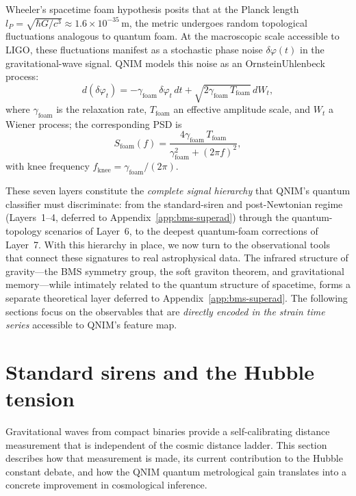\documentclass[11pt,a4paper, english]{book}
\theoremstyle{plain}
\theoremstyle{definition}
\numberwithin{equation}{chapter}
\numberwithin{figure}{chapter}
\numberwithin{table}{chapter}
\begin{document}
Wheeler's spacetime foam hypothesis posits that at the Planck length
$l_P = \sqrt{\hbar G/c^3} \approx 1.6\times10^{-35}$\,m, the metric
undergoes random topological fluctuations analogous to quantum foam.
At the macroscopic scale accessible to LIGO, these fluctuations manifest
as a stochastic phase noise $\delta\varphi(t)$ in the gravitational-wave
signal.  QNIM models this noise as an OrnsteinUhlenbeck process:
\begin{equation}
  \label{eq:ou_process}
  d(\delta\varphi_t) = -\gamma_\mathrm{foam}\,\delta\varphi_t\,dt
    + \sqrt{2\gamma_\mathrm{foam}\,T_\mathrm{foam}}\,dW_t,
\end{equation}
where $\gamma_\mathrm{foam}$ is the relaxation rate, $T_\mathrm{foam}$ an effective amplitude scale, and $W_t$ a Wiener process; the corresponding PSD is
\begin{equation}
  \label{eq:ou_spectrum}
  S_\mathrm{foam}(f) =
    \frac{4\gamma_\mathrm{foam}\,T_\mathrm{foam}}
         {\gamma_\mathrm{foam}^2 + (2\pi f)^2},
\end{equation}
with knee frequency $f_\mathrm{knee}=\gamma_\mathrm{foam}/(2\pi)$.

These seven layers constitute the \emph{complete signal hierarchy} that QNIM's quantum classifier must discriminate: from the standard-siren and post-Newtonian regime 
(Layers~1--4, deferred to Appendix~\ref{app:bms-superad}) 
through the quantum-topology scenarios of Layer~6, to the deepest quantum-foam corrections of Layer~7. With this hierarchy in place, we now turn to the observational tools that connect these signatures to real astrophysical data. The infrared structure of gravity—the BMS symmetry group, the soft graviton theorem, and gravitational memory—while intimately related to the quantum structure of spacetime, forms a separate theoretical layer deferred to Appendix~\ref{app:bms-superad}. The following sections focus on the observables that are \emph{directly encoded in the strain time series} accessible to QNIM's feature map.

\section{Standard sirens and the Hubble tension}
\label{sec:standard-sirens}
Gravitational waves from compact binaries provide a self-calibrating distance measurement that is independent of the cosmic distance ladder. This section describes how that measurement is made, its current contribution to the Hubble constant debate, and how the QNIM quantum metrological gain translates into a concrete improvement in cosmological inference.
\end{document}
